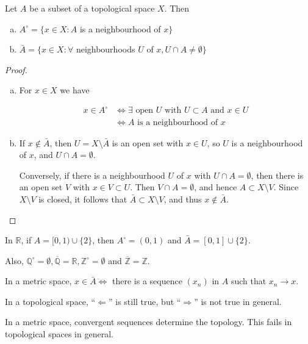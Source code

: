 \documentclass[a4paper,11pt]{article}
\begin{document}
\begin{proposition}
    Let $A$ be a subset of a topological space $X$. Then
    \begin{enumerate}[(a)]
        \item $A^{\circ}=\{x \in X: A$ is a neighbourhood of $x\}$
        \item $\bar{A}=\{x \in X: \forall $ neighbourhoods $U$ of $x, U \cap A \neq \emptyset\}$
    \end{enumerate}
\end{proposition}
\begin{proof}
    \begin{enumerate}[(a)]
        \item For $x \in X$ we have

        $$
        \begin{aligned}
        x \in A^{\circ} & \Longleftrightarrow \exists \text { open } U \text { with } U \subset A \text { and } x \in U \\
        & \Longleftrightarrow A \text { is a neighbourhood of } x
        \end{aligned}
        $$
        
        \item If $x \notin \bar{A}$, then $U=X \setminus \bar{A}$ is an open set with $x \in U$, so $U$ is a neighbourhood of $x$, and $U \cap A=\emptyset$.
        
        Conversely, if there is a neighbourhood $U$ of $x$ with $U \cap A=\emptyset$, then there is an open set $V$ with $x \in V \subset U$. Then $V \cap A=\emptyset$, and hence $A \subset X \setminus V$. Since $X \setminus V$ is closed, it follows that $\bar{A} \subset X \setminus V$, and thus $x \notin \bar{A}$.\qedhere
    \end{enumerate}
\end{proof}

\begin{example}
    In $\mathbb{R}$, if $A=[0,1) \cup\{2\}$, then $A^{\circ}=(0,1)$ and $\bar{A}=[0,1] \cup\{2\}$.

    Also, $\mathbb{Q}^{\circ}=\emptyset, \overline{\mathbb{Q}}=\mathbb{R}, \mathbb{Z}^{\circ}=\emptyset$ and $\overline{\mathbb{Z}}=\mathbb{Z}$.
\end{example}

\begin{note}
    In a metric space, $x \in \bar{A} \Longleftrightarrow$ there is a sequence $\left(x_{n}\right)$ in $A$ such that $x_{n} \rightarrow x$.

In a topological space, ``$\Longleftarrow $'' is still true, but ``$\Longrightarrow $'' is not true in general.

In a metric space, convergent sequences determine the topology. This fails in topological spaces in general.
\end{note}
\end{document}
